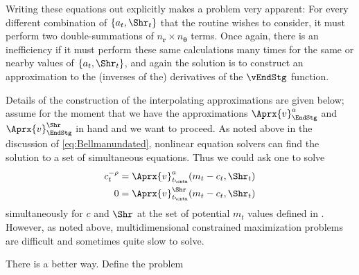 \documentclass[titlepage, headings=optiontotocandhead]{Resources/texmf-local/tex/latex/econtex}
\begin{document}
Writing these equations out explicitly makes a problem very apparent: For every different combination of $\{{a}_{t},\Shr_{t}\}$ that the routine wishes to consider, it must perform two double-summations of $n_{{\mathbf{r}}} \times n_{\pmb{\theta}}$ terms.  Once again, there is an inefficiency if it must perform these same calculations many times for the same or nearby values of $\{{a}_{t},\Shr_{t}\}$, and again the solution is to construct an approximation to the (inverses of the) derivatives of the $\vEndStg$ function.

Details of the construction of the interpolating approximations are given below; assume for the moment that we have the approximations $\Aprx{v}_{\EndStg}^{a}$ and $\Aprx{v}_{\EndStg}^{\Shr}$ in hand and we want to proceed.  As noted above in the discussion of \eqref{eq:Bellmanundated}, nonlinear equation solvers can find the solution to a set of simultaneous equations.  Thus we could ask one to solve
\begin{equation}\begin{gathered}\begin{aligned}
      c_{t}^{-\rho}  & = \Aprx{v}^{a}_{{t_\cntn}}(m_{t}-c_{t},\Shr_{t}) %
      \\      0  & = \Aprx{v}^{\Shr}_{{t_\cntn}}(m_{t}-c_{t},\Shr_{t}) \label{eq:FOCwrtw}
    \end{aligned}\end{gathered}\end{equation}
simultaneously for $c$ and $\Shr$ at the set of potential $m_{t}$ values defined in {\mVec}. However, as noted above, multidimensional constrained
maximization problems are difficult and sometimes quite slow to
solve.

There is a better way.  Define the problem
\end{document}
